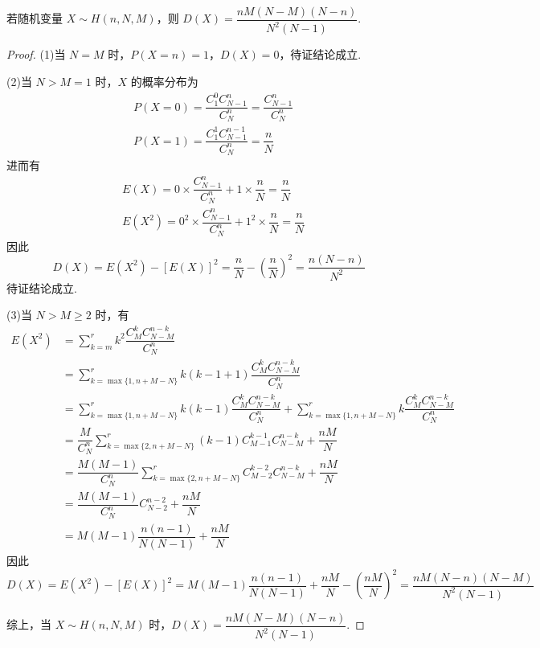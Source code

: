 \begin{conclusion}
    \indent 若随机变量 $X \sim H(n,N,M)$，则 $D(X) = \dfrac{nM(N-M)(N-n)}{N^2 (N-1)}$.
\end{conclusion}

\begin{proof}
    (1)当 $N=M$ 时，$P(X=n)=1$，$D(X)=0$，待证结论成立.

    (2)当 $N>M=1$ 时，$X$ 的概率分布为
    $$
    \begin{aligned}
        & P(X=0) = \dfrac{C_1^0 C_{N-1}^n}{C_N^n} = \dfrac{C_{N-1}^n}{C_N^n} \\
        & P(X=1) = \dfrac{C_1^1 C_{N-1}^{n-1}}{C_N^n} = \dfrac{n}{N}
    \end{aligned}
    $$
    进而有
    $$
    \begin{aligned}
        & E(X) = 0 \times \dfrac{C_{N-1}^n}{C_N^n} + 1 \times \dfrac{n}{N} = \dfrac{n}{N} \\
        & E(X^2) = 0^2 \times \dfrac{C_{N-1}^n}{C_N^n} + 1^2 \times \dfrac{n}{N} = \dfrac{n}{N}
    \end{aligned}
    $$
    因此
    $$
    D(X) = E(X^2) - [E(X)]^2 = \dfrac{n}{N} - \left( \dfrac{n}{N} \right)^2 = \dfrac{n(N-n)}{N^2}
    $$
    待证结论成立.
    
    (3)当 $N > M \geqslant 2$ 时，有
    $$
    \begin{aligned}
        E(X^2) &= \sum_{k=m}^{r} k^2 \dfrac{C_M^k C_{N-M}^{n-k}}{C_N^n} \\
        &= \sum_{k=\max\{ 1, n+M-N \}}^{r} k(k-1+1) \dfrac{C_M^k C_{N-M}^{n-k}}{C_N^n} \\
        &= \sum_{k=\max\{ 1, n+M-N \}}^{r} k(k-1) \dfrac{C_M^k C_{N-M}^{n-k}}{C_N^n} + \sum_{k=\max\{ 1, n+M-N \}}^{r} k \dfrac{C_M^k C_{N-M}^{n-k}}{C_N^n} \\
        &= \dfrac{M}{C_N^n} \sum_{k=\max\{ 2, n+M-N \}}^{r} (k-1) C_{M-1}^{k-1} C_{N-M}^{n-k} + \dfrac{nM}{N} \\
        &= \dfrac{M(M-1)}{C_N^n} \sum_{k=\max\{ 2, n+M-N \}}^{r} C_{M-2}^{k-2} C_{N-M}^{n-k} + \dfrac{nM}{N} \\
        &= \dfrac{M(M-1)}{C_N^n} C_{N-2}^{n-2} + \dfrac{nM}{N} \\
        &= M(M-1) \dfrac{n(n-1)}{N(N-1)} + \dfrac{nM}{N}
    \end{aligned}
    $$
    因此
    $$
    D(X) = E(X^2) - [E(X)]^2 = M(M-1) \dfrac{n(n-1)}{N(N-1)} + \dfrac{nM}{N} - \left( \dfrac{nM}{N} \right)^2 = \dfrac{nM(N-n)(N-M)}{N^2 (N-1)}
    $$

    综上，当 $X \sim H(n,N,M)$ 时，$D(X) = \dfrac{nM(N-M)(N-n)}{N^2 (N-1)}$.
\end{proof}

